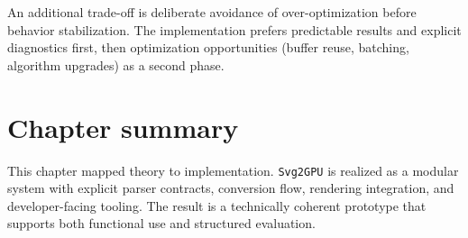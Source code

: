 An additional trade-off is deliberate avoidance of over-optimization before behavior stabilization.
The implementation prefers predictable results and explicit diagnostics first, then optimization opportunities (buffer reuse, batching, algorithm upgrades) as a second phase.

\section{Chapter summary}

This chapter mapped theory to implementation.
\texttt{Svg2GPU} is realized as a modular system with explicit parser contracts, conversion flow, rendering integration, and developer-facing tooling.
The result is a technically coherent prototype that supports both functional use and structured evaluation.
